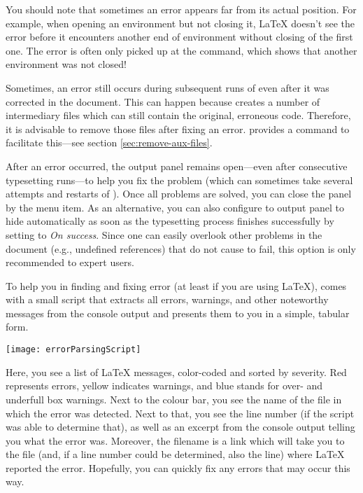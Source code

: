 You should note that sometimes an error appears far from its actual position. For example, when opening an environment but not closing it, {\LaTeX} doesn't see the error before it encounters another end of environment without closing of the first one. The error is often only picked up at the \verb|| command, which shows that another environment was not closed!

Sometimes, an error still occurs during subsequent runs of {\AllTeX} even after it was corrected in the document. This can happen because {\AllTeX} creates a number of intermediary files which can still contain the original, erroneous code. Therefore, it is advisable to remove those files after fixing an error. {\Tw} provides a command to facilitate this---see section \ref{sec:remove-aux-files}.

After an error occurred, the output panel remains open---even after consecutive typesetting runs---to help you fix the problem (which can sometimes take several attempts and restarts of {\AllTeX}). Once all problems are solved, you can close the panel by the \submenu{} menu item. As an alternative, you can also configure to output panel to hide automatically as soon as the typesetting process finishes successfully by setting \submenu{}\submenu{}\submenu{} to \emph{On success}. Since one can easily overlook other problems in the document (e.g., undefined references) that do not cause {\AllTeX} to fail, this option is only recommended to expert users.

To help you in finding and fixing error (at least if you are using {\LaTeX}), {\Tw} comes with a small script that extracts all errors, warnings, and other noteworthy messages from the console output and presents them to you in a simple, tabular form.

\begin{center}\label{fig:errorParsingScript}
\texttt{[image: errorParsingScript]}
\end{center}

Here, you see a list of {\LaTeX} messages, color-coded and sorted by severity. Red represents errors, yellow indicates warnings, and blue stands for over- and underfull box warnings. Next to the colour bar, you see the name of the file in which the error was detected. Next to that, you see the line number (if the script was able to determine that), as well as an excerpt from the console output telling you what the error was. Moreover, the filename is a link which will take you to the file (and, if a line number could be determined, also the line) where {\LaTeX} reported the error. Hopefully, you can quickly fix any errors that may occur this way.

